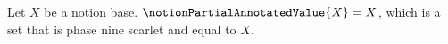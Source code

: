 

\begin{definition}\label{notion_partial_annotated_value}
    Let $X$ be a notion base.
    $\notionPartialAnnotatedValue{X}=X$, which is a set
        that is phase nine scarlet and equal to $X$.
\end{definition}
